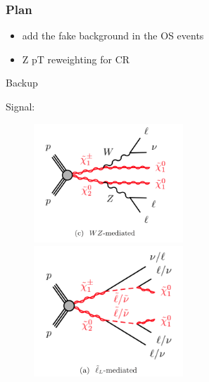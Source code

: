 \documentclass[mathserif,serif]{beamer}
\begin{document}
\begin{frame}
\frametitle{Plan}
\begin{itemize}
\item add the fake background in the OS events
\item Z pT reweighting for CR
\end{itemize}
\end{frame}

\begin{frame}
\begin{center}
\huge
Backup
\end{center}
\end{frame}

\begin{frame}
\small
Signal:\\
\begin{figure}
\includegraphics[width=0.5\textwidth]{data/WZ.png}
\includegraphics[width=0.5\textwidth]{data/slepton.png}
\end{figure}
\end{frame}
\end{document}
